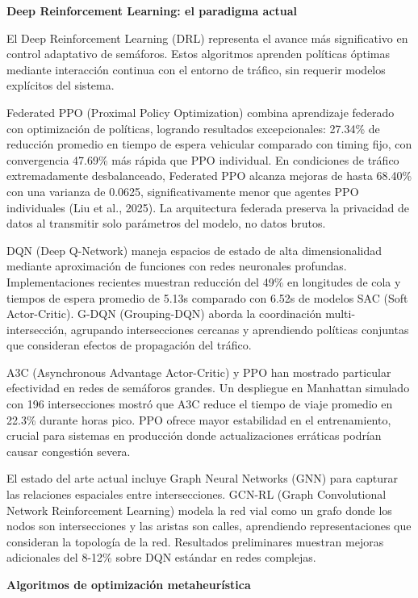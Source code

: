 \documentclass[12pt,a4paper,oneside]{report}
\begin{document}
\textbf{Deep Reinforcement Learning: el paradigma actual}

El Deep Reinforcement Learning (DRL) representa el avance más significativo en control adaptativo de semáforos. Estos algoritmos aprenden políticas óptimas mediante interacción continua con el entorno de tráfico, sin requerir modelos explícitos del sistema.

Federated PPO (Proximal Policy Optimization) combina aprendizaje federado con optimización de políticas, logrando resultados excepcionales: 27.34\% de reducción promedio en tiempo de espera vehicular comparado con timing fijo, con convergencia 47.69\% más rápida que PPO individual. En condiciones de tráfico extremadamente desbalanceado, Federated PPO alcanza mejoras de hasta 68.40\% con una varianza de 0.0625, significativamente menor que agentes PPO individuales (Liu et al., 2025). La arquitectura federada preserva la privacidad de datos al transmitir solo parámetros del modelo, no datos brutos.

DQN (Deep Q-Network) maneja espacios de estado de alta dimensionalidad mediante aproximación de funciones con redes neuronales profundas. Implementaciones recientes muestran reducción del 49\% en longitudes de cola y tiempos de espera promedio de 5.13s comparado con 6.52s de modelos SAC (Soft Actor-Critic). G-DQN (Grouping-DQN) aborda la coordinación multi-intersección, agrupando intersecciones cercanas y aprendiendo políticas conjuntas que consideran efectos de propagación del tráfico.

A3C (Asynchronous Advantage Actor-Critic) y PPO han mostrado particular efectividad en redes de semáforos grandes. Un despliegue en Manhattan simulado con 196 intersecciones mostró que A3C reduce el tiempo de viaje promedio en 22.3\% durante horas pico. PPO ofrece mayor estabilidad en el entrenamiento, crucial para sistemas en producción donde actualizaciones erráticas podrían causar congestión severa.

El estado del arte actual incluye Graph Neural Networks (GNN) para capturar las relaciones espaciales entre intersecciones. GCN-RL (Graph Convolutional Network Reinforcement Learning) modela la red vial como un grafo donde los nodos son intersecciones y las aristas son calles, aprendiendo representaciones que consideran la topología de la red. Resultados preliminares muestran mejoras adicionales del 8-12\% sobre DQN estándar en redes complejas.

\textbf{Algoritmos de optimización metaheurística}
\end{document}
